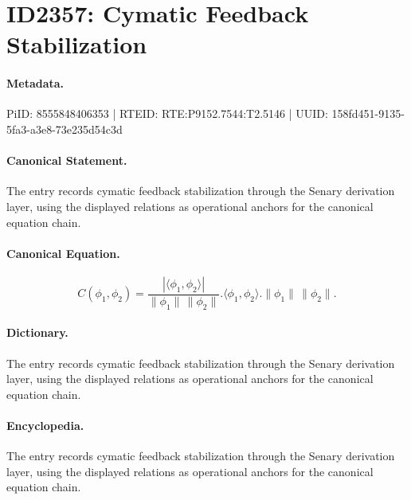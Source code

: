 \section*{ID2357: Cymatic Feedback Stabilization}
\paragraph{Metadata.}
PiID: 8555848406353 | RTEID: RTE:P9152.7544:T2.5146 | UUID: 158fd451-9135-5fa3-a3e8-73e235d54c3d

\paragraph{Canonical Statement.}
The entry records cymatic feedback stabilization through the Senary derivation layer, using the displayed relations as operational anchors for the canonical equation chain.

\paragraph{Canonical Equation.}
\[
C(\phi_1,\phi_2) = \frac{ \left|\langle \phi_1,\phi_2\rangle\right| }{ \lVert \phi_1\rVert\,\lVert \phi_2\rVert }. \langle \phi_1,\phi_2\rangle. \lVert \phi_1\rVert\,\lVert \phi_2\rVert.
\]

\paragraph{Dictionary.}
The entry records cymatic feedback stabilization through the Senary derivation layer, using the displayed relations as operational anchors for the canonical equation chain.

\paragraph{Encyclopedia.}
The entry records cymatic feedback stabilization through the Senary derivation layer, using the displayed relations as operational anchors for the canonical equation chain.
